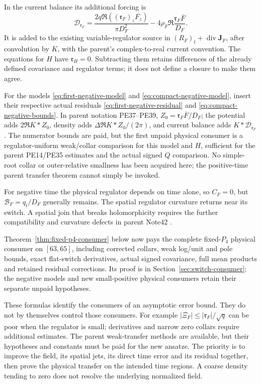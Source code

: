 \documentclass[11pt]{article}
\numberwithin{equation}{section}
\begin{document}
In the current balance its additional forcing is
\begin{equation}
 \mathcal D_{\mathfrak r_F}
 =\frac{2q\Re((\mathfrak r_F)_z\overline{F_z})}{\pi D_F^2}
  -4\rho_F\Re\frac{\mathfrak r_F\overline F}{D_F}.
 \label{eq:forced-current}
\end{equation}
It is added to the existing variable-regulator source in
\((R_F)_t+\operatorname{div}\mathbf J_F\), after convolution
by \(K\), with the parent's complex-to-real current convention.
The equations for \(H\) have \(\mathfrak r_H=0\). Subtracting
them retains differences of the already defined covariance and
regulator terms; it does not define a closure to make them agree.

For the models \eqref{eq:first-negative-model} and
\eqref{eq:compact-negative-model}, insert their respective actual
residuals \eqref{eq:first-negative-residual} and
\eqref{eq:compact-negative-bounds}. In parent notation PE37--PE39,
\(Z_0=\mathfrak r_F\overline F/D_F\); the potential adds
\(2\Re K*Z_0\), density adds
\(\Delta\Re K*Z_0/(2\pi)\), and current balance adds
\(K*\mathcal D_{\mathfrak r_F}\). The numerator bounds are paid,
but the first unpaid physical consumer is a regulator-uniform
weak/collar comparison for this model and \(H\), sufficient for the
parent PE14/PE35 estimates and the actual signed \(Q\) comparison.
No simple-root collar or outer-relative smallness has been acquired
here; the positive-time parent transfer theorem cannot simply be invoked.

For negative time the physical regulator depends on time alone, so
\(C_F=0\), but \(\mathcal B_F=q_t/D_F\) generally remains.
The spatial regulator curvature returns near its switch. A spatial
join that breaks holomorphicity requires the further compatibility
and curvature defects in parent Note42 \cite{parent42}.

Theorem~\ref{thm:fixed-p4-consumer} below now pays the complete fixed-$P_4$
physical consumer on $[63,65]$, including corrected collars, weak log/unit
and pole bounds, exact flat-switch derivatives, actual signed covariance,
full mean products and retained residual corrections. Its proof is in
Section~\ref{sec:switch-consumer}; the negative models and new
small-positive physical consumers retain their separate unpaid hypotheses.

These formulas identify the consumers of an asymptotic error bound.
They do not by themselves control those consumers. For example
\( |\Xi_F|\le |\mathfrak r_F|/\sqrt q\) can be poor when the
regulator is small; derivatives and narrow zero collars require
additional estimates. The parent weak-transfer methods are available,
but their hypotheses and constants must be paid for the new ansatze.
The priority is to improve the field, its spatial jets, its direct
time error and its residual together, then prove the physical transfer
on the intended time regions. A coarse density tending to zero does
not resolve the underlying normalized field.
\end{document}
